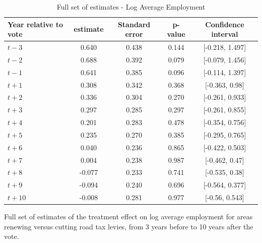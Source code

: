 \begin{table}[htbp]
    \centering
    \caption{Full set of estimates - Log Average Employment}
    \label{tab:log_average_employment}
    \begin{tabular}{p{3cm}cccc}
        \hline
        Year relative to vote & estimate & Standard error & p-value & Confidence interval \\
        \hline
        $t - 3$  & 0.640  & 0.438  & 0.144  & [-0.218, 1.497] \\
        $t - 2$  & 0.688  & 0.392  & 0.079  & [-0.079, 1.456] \\
        $t - 1$  & 0.641  & 0.385  & 0.096  & [-0.114, 1.397] \\
        $t + 1$ & 0.308  & 0.342  & 0.368  & [-0.363, 0.98] \\
        $t + 2$ & 0.336  & 0.304  & 0.270  & [-0.261, 0.933] \\
        $t + 3$ & 0.297  & 0.285  & 0.297  & [-0.261, 0.855] \\
        $t + 4$ & 0.201  & 0.283  & 0.478  & [-0.354, 0.756] \\
        $t + 5$ & 0.235  & 0.270  & 0.385  & [-0.295, 0.765] \\
        $t + 6$ & 0.040  & 0.236  & 0.865  & [-0.422, 0.503] \\
        $t + 7$ & 0.004  & 0.238  & 0.987  & [-0.462, 0.47] \\
        $t + 8$ & -0.077 & 0.233  & 0.741  & [-0.535, 0.38] \\
        $t + 9$ & -0.094 & 0.240  & 0.696  & [-0.564, 0.377] \\
        $t + 10$ & -0.008 & 0.281  & 0.977  & [-0.56, 0.543] \\
        \hline
    \end{tabular}
    \begin{tablenotes}
        \small
        \item Full set of estimates of the treatment effect on log average employment for areas renewing versus cutting road tax levies, from 3 years before to 10 years after the vote.
    \end{tablenotes}
\end{table}

